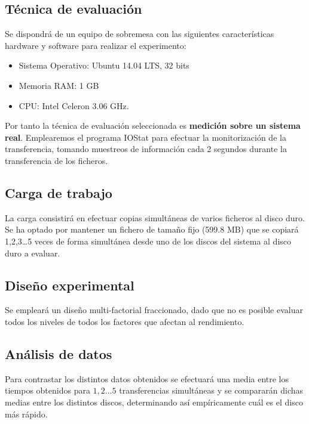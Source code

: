 \documentclass[a4paper,10pt]{article}
\begin{document}
 \subsection{Técnica de evaluación}
 Se dispondrá de un equipo de sobremesa con las siguientes características hardware y software para realizar el experimento:
 \begin{itemize}
  \item Sistema Operativo: Ubuntu 14.04 LTS, 32 bits
  \item Memoria RAM: 1 GB
  \item CPU: Intel Celeron 3.06 GHz.
 \end{itemize}
 Por tanto la técnica de evaluación seleccionada es \textbf{medición sobre un sistema real}. Emplearemos el programa
 IOStat para efectuar la monitorización de la transferencia, tomando muestreos de información cada 2 segundos durante
 la transferencia de los ficheros.

 \subsection{Carga de trabajo}
 La carga consistirá en efectuar copias simultáneas de varios ficheros al disco duro. Se ha optado por mantener
 un fichero de tamaño fijo (599.8 MB) que se copiará 1,2,3\ldots 5 veces de forma simultánea desde uno de los discos
 del sistema al disco duro a evaluar.%
 
 \subsection{Diseño experimental}
 Se empleará un diseño multi-factorial fraccionado, dado que no es posible evaluar todos los niveles de todos los factores
 que afectan al rendimiento. 
 
 \subsection{Análisis de datos}
 Para contrastar los distintos datos obtenidos se efectuará una media entre los tiempos obtenidos para $1,2\ldots 5$
 transferencias simultáneas y se compararán dichas medias entre los distintos discos, determinando así empíricamente
 cuál es el disco más rápido.
 
\end{document}
